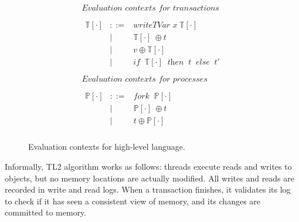 \documentclass{jfp1}
\newcommand{\Fork}{\textit{fork }}
\newcommand{\Write}{\textit{writeTVar }}
\newcommand{\If}{\textit{if }}
\newcommand{\Then}{\textit{ then }}
\newcommand{\Else}{\textit{ else }}
\newcommand{\EvalCtxTran}[1]{\ensuremath{\mathbb{T}[#1]}}
\newcommand{\EvalCtxProc}[1]{\ensuremath{\mathbb{P}[#1]}}
\begin{document}
\begin{figure}[h]
        \[
              \begin{array}{c}
                   \textit{Evaluation contexts for transactions} \\
                   \\
                   \begin{array}{rcl}
                      \EvalCtxTran{\cdot} & ::=    & \Write x\:\EvalCtxTran{\cdot}\\
                                                      & \mid &\EvalCtxTran{\cdot}\:\oplus t\\
                                                      & \mid & v\oplus\EvalCtxTran{\cdot}\\
                                                      & \mid &\If\:\EvalCtxTran{\cdot}\:\Then\:t\:\Else\:t'
                   \end{array}
                    \\
                \\
                    \textit{Evaluation contexts for processes}\\
                    \\
                    \begin{array}{rcl}
                      \EvalCtxProc{\cdot} & ::=    & \Fork\:\EvalCtxProc{\cdot}\\
                                                      & \mid &\EvalCtxProc{\cdot}\:\oplus t\\
                                                      & \mid & t\oplus\EvalCtxProc{\cdot}\\
                    \end{array}
              \end{array}
        \]
        \centering
        \caption{Evaluation contexts for high-level language.}
        \label{fig:hole-syntax}
     \end{figure}

Informally, TL2 algorithm works as follows: threads execute reads and
writes to objects, but no memory locations are actually modified. All 
writes and reads are recorded in write and read logs. When a
transaction finishes, it validates its log to check if it has seen a 
consistent view of memory, and its changes are committed to memory.
\end{document}
